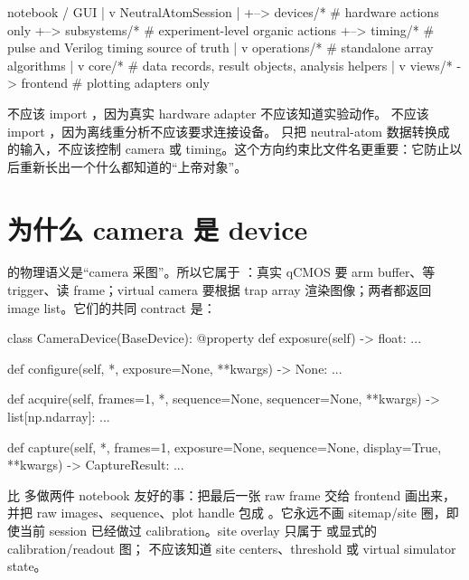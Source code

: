 \documentclass[11pt,oneside,openany]{book}
\begin{document}
\begin{codeblock}
notebook / GUI
    |
    v
NeutralAtomSession
    |
    +--> devices/*        # hardware actions only
    +--> subsystems/*     # experiment-level organic actions
    +--> timing/*         # pulse and Verilog timing source of truth
    |
    v
operations/*              # standalone array algorithms
    |
    v
core/*                    # data records, result objects, analysis helpers
    |
    v
views/* -> frontend       # plotting adapters only
\end{codeblock}

 不应该 import ，因为真实 hardware adapter 不应该知道实验动作。  不应该 import ，因为离线重分析不应该要求连接设备。  只把 neutral-atom 数据转换成  的输入，不应该控制 camera 或 timing。这个方向约束比文件名更重要：它防止以后重新长出一个什么都知道的“上帝对象”。

\section{为什么 camera 是 device}
 的物理语义是“camera 采图”。所以它属于 ：真实 qCMOS 要 arm buffer、等 trigger、读 frame；virtual camera 要根据 trap array 渲染图像；两者都返回 image list。它们的共同 contract 是：
\begin{codeblock}[Python]
class CameraDevice(BaseDevice):
    @property
    def exposure(self) -> float: ...

    def configure(self, *, exposure=None, **kwargs) -> None: ...

    def acquire(self, frames=1, *, sequence=None, sequencer=None, **kwargs) -> list[np.ndarray]: ...

    def capture(self, *, frames=1, exposure=None, sequence=None, display=True, **kwargs) -> CaptureResult:
        ...
\end{codeblock}

 比  多做两件 notebook 友好的事：把最后一张 raw frame 交给 frontend 画出来，并把 raw images、sequence、plot handle 包成 。它永远不画 sitemap/site 圈，即使当前 session 已经做过 calibration。site overlay 只属于  或显式的 calibration/readout 图； 不应该知道 site centers、threshold 或 virtual simulator state。
\end{document}
